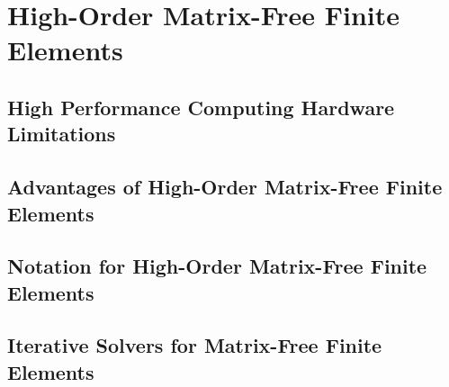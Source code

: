 \chapter{High-Order Matrix-Free Finite Elements}\label{ch:HighOrderFEM}


\section{High Performance Computing Hardware Limitations}\label{sec:highorderwhy}


\section{Advantages of High-Order Matrix-Free Finite Elements}\label{sec:highorderbenefits}


\section{Notation for High-Order Matrix-Free Finite Elements}\label{sec:highordernotation}


\section{Iterative Solvers for Matrix-Free Finite Elements}\label{sec:highordersolvers}

